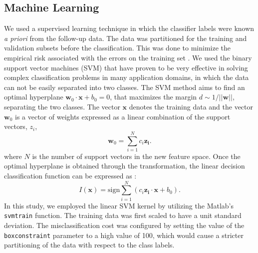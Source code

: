 \documentclass[a4paper,twoside]{article}
\begin{document}
\subsection{Machine Learning}
%
We used a supervised learning technique in which the classifier labels were known \emph{a priori} from the follow-up data.  The data was partitioned for the training and validation subsets before the classification. This was done to minimize the empirical risk associated with the errors on the training set \cite{vapnik_estimation_2006,vapnik_nature_2000}. We used the binary support vector machines (SVM) that have proven to be very effective in solving complex classification problems in many application domains, in which the data can not be easily separated into two classes. The SVM method aims to find an optimal hyperplane $\mathbf{w}_{0}\cdot \mathbf{x} + b_{0} = 0$, that maximizes the margin $d \sim 1/||\mathbf{w}||$, separating the two classes. The vector $\mathbf{x}$ denotes the training data and the vector $\mathbf{w}_0$ is a vector of weights expressed as a linear combination of the support vectors, $z_i$,
%
\begin{equation}
    \mathbf{w}_0 = \sum ^{N}_{i=1} c_i \mathbf{z_i}.
\end{equation}
%
where $N$ is the number of support vectors in the new feature space. Once the optimal hyperplane is obtained through the transformation, the linear decision classification function can be expressed as \cite{cortes1995support}:
%
\begin{equation}
    I(\mathbf{x}) = \mathrm{sign} \sum_{i = 1}^{N} \left( c_i \mathbf{z_i} \cdot \mathbf{x} + b_{0} \right).
\end{equation}
%
In this study, we employed the linear SVM kernel by utilizing the Matlab's \texttt{svmtrain} function. The training data was first scaled to have a unit standard deviation. The misclassification cost was configured by setting the value of the \texttt{boxconstraint} parameter to a high value of \num{100}, which would cause a stricter partitioning of the data with respect to the class labels.
\end{document}
